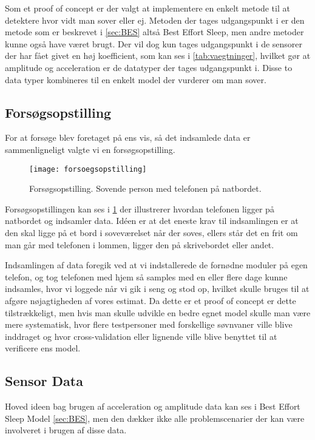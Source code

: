 Som et proof of concept er der valgt at implementere en enkelt metode til at detektere hvor vidt man sover eller ej.
Metoden der tages udgangspunkt i er den metode som er beskrevet i \cref{sec:BES} altså Best Effort Sleep, men andre metoder kunne også have været brugt.
Der vil dog kun tages udgangspunkt i de sensorer der har fået givet en høj koefficient, som kan ses i \cref{tab:vaegtninger}, hvilket gør at amplitude og acceleration er de datatyper der tages udgangspunkt i.
Disse to data typer kombineres til en enkelt model der vurderer om man sover.

\subsection{Forsøgsopstilling}
For at forsøge blev foretaget på ens vis, så det indsamlede data er sammenligneligt valgte vi en forsøgsopstilling.
\begin{figure}[h]
	\centering
	\texttt{[image: forsoegsopstilling]}
	\caption{Forsøgsopstilling. Sovende person med telefonen på natbordet.}
	\label{fig:forsoegopstillings}
\end{figure}

Forsøgsopstillingen kan ses i \cref{fig:forsoegopstillings} der illustrerer hvordan telefonen ligger på natbordet og indsamler data.
Idéen er at det eneste krav til indsamlingen er at den skal ligge på et bord i soveværelset når der soves, ellers står det en frit om man går med telefonen i lommen, ligger den på skrivebordet eller andet.

Indsamlingen af data foregik ved at vi indstallerede de fornødne moduler på egen telefon, og tog telefonen med hjem så samples med en eller flere dage kunne indsamles, hvor vi loggede når vi gik i seng og stod op, hvilket skulle bruges til at afgøre nøjagtigheden af vores estimat.
Da dette er et proof of concept er dette tilstrækkeligt, men hvis man skulle udvikle en bedre egnet model skulle man være mere systematisk, hvor flere testpersoner med forskellige søvnvaner ville blive inddraget og hvor cross-validation eller lignende ville blive benyttet til at verificere ens model.

\subsection{Sensor Data}
Hoved ideen bag brugen af acceleration og amplitude data kan ses i Best Effort Sleep Model \cref{sec:BES}, men den dækker ikke alle problemscenarier der kan være involveret i brugen af disse data.

